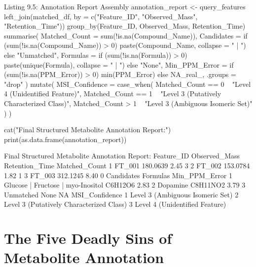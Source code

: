 \documentclass[11pt,twoside,openright]{book}
\begin{document}
\begin{rchunk}{Listing 9.5: Annotation Report Assembly}
annotation_report <- query_features %
  left_join(matched_df, by = c("Feature_ID", "Observed_Mass", "Retention_Time")) %
  group_by(Feature_ID, Observed_Mass, Retention_Time) %
  summarise(
    Matched_Count  = sum(!is.na(Compound_Name)),
    Candidates     = if (sum(!is.na(Compound_Name)) > 0) paste(Compound_Name, collapse = " | ") else "Unmatched",
    Formulas       = if (sum(!is.na(Formula)) > 0) paste(unique(Formula), collapse = " | ") else "None",
    Min_PPM_Error  = if (sum(!is.na(PPM_Error)) > 0) min(PPM_Error) else NA_real_,
    .groups        = "drop"
  ) %
  mutate(
    MSI_Confidence = case_when(
      Matched_Count == 0 ~ "Level 4 (Unidentified Feature)",
      Matched_Count == 1 ~ "Level 3 (Putatively Characterized Class)",
      Matched_Count > 1  ~ "Level 3 (Ambiguous Isomeric Set)"
    )
  )

cat("Final Structured Metabolite Annotation Report:\n")
print(as.data.frame(annotation_report))
\end{rchunk}

\begin{routput}
Final Structured Metabolite Annotation Report:
  Feature\_ID Observed\_Mass Retention\_Time Matched\_Count
1     FT\_001      180.0639           2.45             3
2     FT\_002      153.0784           1.82             1
3     FT\_003      312.1245           8.40             0
                         Candidates Formulas Min\_PPM\_Error
1 Glucose | Fructose | myo-Inositol  C6H12O6          2.83
2                          Dopamine C8H11NO2          3.79
3                         Unmatched     None            NA
                            MSI\_Confidence
1         Level 3 (Ambiguous Isomeric Set)
2 Level 3 (Putatively Characterized Class)
3           Level 4 (Unidentified Feature)
\end{routput}

\section{The Five Deadly Sins of Metabolite Annotation}
\end{document}
